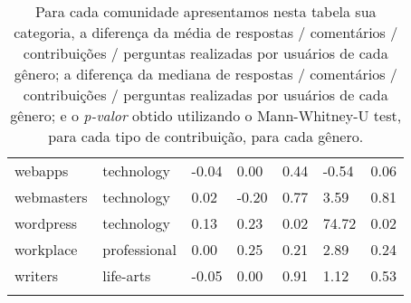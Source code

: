 \begin{longtabu}{@{}
	p{0.17\linewidth}
	p{0.2\linewidth}
	P{0.1\linewidth}
	P{0.1\linewidth}
	P{0.1\linewidth}
	P{0.1\linewidth}
	p{0.1\linewidth}@{}}
webapps          & technology         & -0.04          & 0.00           & 0.44   & -0.54             & 0.06             \\
webmasters       & technology         & 0.02           & -0.20          & 0.77   & 3.59              & 0.81             \\
wordpress        & technology         & 0.13           & 0.23           & 0.02   & 74.72             & 0.02             \\
workplace        & professional       & 0.00           & 0.25           & 0.21   & 2.89              & 0.24             \\
writers          & life-arts          & -0.05          & 0.00           & 0.91   & 1.12              & 0.53             \\ \bottomrule

\caption[Sumário do tempo de dedicação à comunidade]{Para cada comunidade apresentamos nesta tabela sua categoria, a diferença da média de respostas / comentários / contribuições / perguntas realizadas por usuários de cada gênero; a diferença da mediana de respostas / comentários / contribuições / perguntas realizadas por usuários de cada gênero; e o \textit{p-valor} obtido utilizando o Mann-Whitney-U test, para cada tipo de contribuição, para cada gênero.}
\end{longtabu}